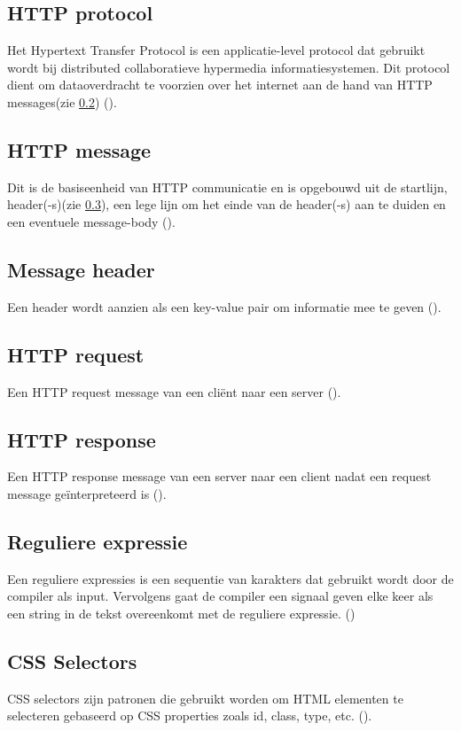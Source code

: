 \subsection{HTTP protocol} \label{HTTP protocol}
Het Hypertext Transfer Protocol is een applicatie-level protocol dat gebruikt wordt bij distributed collaboratieve hypermedia informatiesystemen. Dit protocol dient om dataoverdracht te voorzien over het internet aan de hand van HTTP messages(zie \ref{HTTP message}) (\cite{rfc2616}). 
\subsection{HTTP message}\label{HTTP message}
Dit is de basiseenheid van HTTP communicatie en is opgebouwd uit de startlijn, header(-s)(zie \ref{Message header}), een lege lijn om het einde van de header(-s) aan te duiden en een eventuele message-body (\cite{rfc2616}).
\subsection{Message header} \label{Message header}
Een header wordt aanzien als een key-value pair om informatie mee te geven (\cite{rfc2616}).
\subsection{HTTP request} \label{HTTP request}
Een HTTP request message van een cliënt naar een server (\cite{rfc2616}).
\subsection{HTTP response} \label{HTTP response}
Een HTTP response message van een server naar een client nadat een request message geïnterpreteerd is (\cite{rfc2616}).
\subsection{Reguliere expressie} \label{Reguliere expressie}
Een reguliere expressies is een sequentie van karakters dat gebruikt wordt door de compiler als input. Vervolgens gaat de compiler een signaal geven elke keer als een string in de tekst overeenkomt met de reguliere expressie.  (\cite{10.1145/363347.363387})
\subsection{CSS Selectors} \label{css selectors}
CSS selectors zijn patronen die gebruikt worden om HTML elementen te selecteren gebaseerd op CSS properties zoals id, class, type, etc. (\cite{Persson2019}).


